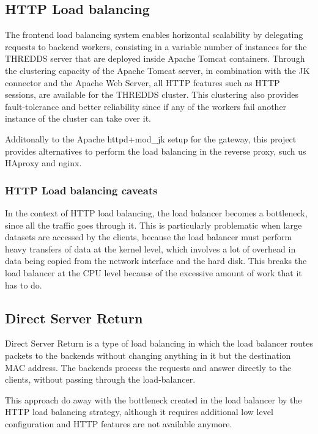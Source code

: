 \documentclass[a4paper,12pt]{article}
\begin{document}
\subsection{HTTP Load balancing}

The frontend load balancing system enables horizontal scalability by delegating requests to backend workers, consisting in a variable number of instances for the THREDDS server that are deployed inside Apache Tomcat containers. Through the clustering capacity of the Apache Tomcat server, in combination with the JK connector and the Apache Web Server, all HTTP features such as HTTP sessions, are available for the THREDDS cluster. This clustering also provides fault-tolerance and better reliability since if any of the workers fail another instance of the cluster can take over it.

Additonally to the Apache httpd+mod\_jk setup for the gateway, this project provides alternatives to perform the load balancing in the reverse proxy, such us HAproxy and nginx.

\subsubsection{HTTP Load balancing caveats}

In the context of HTTP load balancing, the load balancer becomes a bottleneck, since all the traffic goes through it. This is particularly problematic when large datasets are accessed by the clients, because the load balancer must perform heavy transfers of data at the kernel level, which involves a lot of overhead in data being copied from the network interface and the hard disk. This breaks the load balancer at the CPU level because of the excessive amount of work that it has to do.

\subsection{Direct Server Return}

Direct Server Return is a type of load balancing in which the load balancer routes packets to the backends without changing anything in it but the destination MAC address. The backends process the requests and answer directly to the clients, without passing through the load-balancer.

This approach do away with the bottleneck created in the load balancer by the HTTP load balancing strategy, although it requires additional low level configuration and HTTP features are not available anymore.
\end{document}
